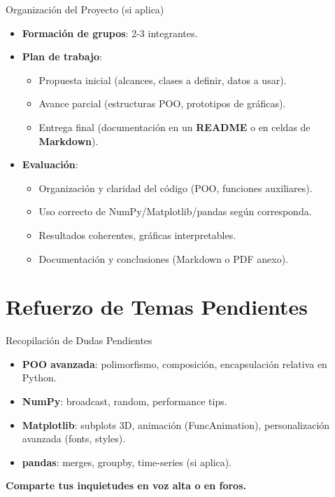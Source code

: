 \documentclass[10pt]{beamer}
\begin{document}
\begin{frame}{Organización del Proyecto (si aplica)}
  \begin{itemize}
    \item \textbf{Formación de grupos}: 2-3 integrantes.
    \item \textbf{Plan de trabajo}:
      \begin{itemize}
        \item Propuesta inicial (alcances, clases a definir, datos a usar).
        \item Avance parcial (estructuras POO, prototipos de gráficas).
        \item Entrega final (documentación en un \textbf{README} o en celdas de \textbf{Markdown}).
      \end{itemize}
    \item \textbf{Evaluación}:
      \begin{itemize}
        \item Organización y claridad del código (POO, funciones auxiliares).
        \item Uso correcto de NumPy/Matplotlib/pandas según corresponda.
        \item Resultados coherentes, gráficas interpretables.
        \item Documentación y conclusiones (Markdown o PDF anexo).
      \end{itemize}
  \end{itemize}
\end{frame}

\section{Refuerzo de Temas Pendientes}

\begin{frame}{Recopilación de Dudas Pendientes}
  \begin{itemize}
    \item \textbf{POO avanzada}: polimorfismo, composición, encapsulación relativa en Python.
    \item \textbf{NumPy}: broadcast, random, performance tips.
    \item \textbf{Matplotlib}: subplots 3D, animación (FuncAnimation), personalización avanzada (fonts, styles).
    \item \textbf{pandas}: merges, groupby, time-series (si aplica).
  \end{itemize}
  \textbf{Comparte tus inquietudes en voz alta o en foros.}
\end{frame}
\end{document}
